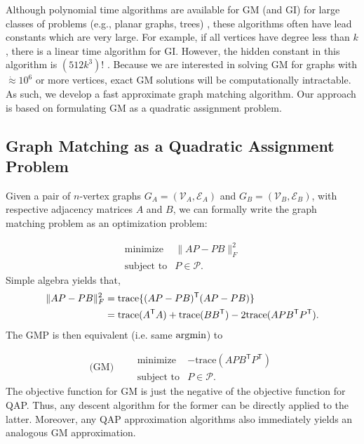 \documentclass[10pt]{article}
\providecommand{\mc}[1]{\mathcal{#1}}
\providecommand{\mc}[1]{\mathcal{#1}}
\newcommand{\T}{^{\ensuremath{\mathsf{T}}}}
\newcommand{\argmin}{\operatornamewithlimits{argmin}}
\begin{document}
Although polynomial time algorithms are available for GM (and GI) for large classes of problems (e.g., planar graphs, trees) \cite{Babai1980}, these
algorithms often have lead constants which are very large.  For example, if all vertices have degree less than $k$, there is a linear time algorithm for GI.  However, the hidden constant in this algorithm is $(512k^3)!$ \cite{Chen1994}.
Because we are interested in solving GM for graphs with $\dot{\approx} 10^6$ or more vertices, exact GM solutions will be computationally intractable. As such, we develop a fast approximate graph matching algorithm.   Our approach is based on formulating GM as a quadratic assignment problem.  


\subsection{Graph Matching as a Quadratic Assignment Problem}
Given a pair of $n$-vertex graphs $G_A=(\mc{V}_A,\mc{E}_A)$ and $G_B=(\mc{V}_B,\mc{E}_B)$, with respective adjacency matrices $A$ and $B$, 
we can formally write the graph matching problem as an optimization problem:

\begin{equation}
\begin{array}{cl}
			\text{minimize}   &\|AP-PB\|^2_F \\
			\text{subject to}  &P\in\mc{P}.   
\end{array}\label{eq:GMc}
\end{equation}
Simple algebra yields that,
\begin{align} \label{eq:equiv}
\|AP - PB\|_F^2  &= \text{trace} \{ (AP - PB)\T (AP - PB)\}\notag\\
&=\text{trace}(A\T A)+\text{trace}(BB\T)-2\text{trace}(APB\T P\T).
\end{align}
The GMP is then equivalent (i.e. same $\argmin$) to 

\begin{equation}
\text{(GM)} \qquad  
\begin{array}{cl}
			\text{minimize}   & - \text{trace}(APB\T P\T) \\
			\text{subject to}  &P \in \mc{P}.   
\end{array}\label{eq:GM}
\end{equation}
The objective function for GM is just the negative of the objective function for QAP. Thus, any descent algorithm for the former can be directly applied to the latter.  Moreover, any QAP approximation algorithms also immediately yields an analogous GM approximation.
\end{document}
